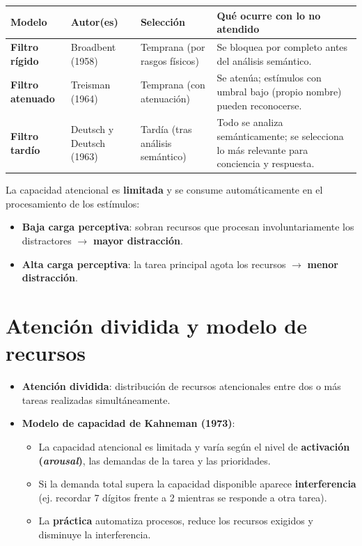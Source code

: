 \documentclass[11pt,a4paper]{article}
\begin{document}
\begin{center}
\begin{tabular}{@{}p{3.1cm}p{2.9cm}p{3.4cm}p{5.0cm}@{}}
\toprule
\textbf{Modelo} & \textbf{Autor(es)} & \textbf{Selección} & \textbf{Qué ocurre con lo no atendido} \\
\midrule
\textbf{Filtro rígido} & Broadbent (1958) & Temprana (por rasgos físicos) & Se bloquea por completo antes del análisis semántico. \\
\textbf{Filtro atenuado} & Treisman (1964) & Temprana (con atenuación) & Se atenúa; estímulos con umbral bajo (propio nombre) pueden reconocerse. \\
\textbf{Filtro tardío} & Deutsch y Deutsch (1963) & Tardía (tras análisis semántico) & Todo se analiza semánticamente; se selecciona lo más relevante para conciencia y respuesta. \\
\bottomrule
\end{tabular}
\end{center}

\begin{cajaClave}[title={Teoría de la carga perceptiva (Lavie, 1995; Forster y Lavie, 2008)}]
La capacidad atencional es \textbf{limitada} y se consume automáticamente en el procesamiento de los estímulos:
\begin{itemize}
  \item \textbf{Baja carga perceptiva}: sobran recursos que procesan involuntariamente los distractores $\rightarrow$ \textbf{mayor distracción}.
  \item \textbf{Alta carga perceptiva}: la tarea principal agota los recursos $\rightarrow$ \textbf{menor distracción}.
\end{itemize}
\end{cajaClave}

\section{Atención dividida y modelo de recursos}

\begin{itemize}
  \item \textbf{Atención dividida}: distribución de recursos atencionales entre dos o más tareas realizadas simultáneamente.
  \item \textbf{Modelo de capacidad de Kahneman (1973)}:
  \begin{itemize}
    \item La capacidad atencional es limitada y varía según el nivel de \textbf{activación (\textit{arousal})}, las demandas de la tarea y las prioridades.
    \item Si la demanda total supera la capacidad disponible aparece \textbf{interferencia} (ej. recordar 7 dígitos frente a 2 mientras se responde a otra tarea).
    \item La \textbf{práctica} automatiza procesos, reduce los recursos exigidos y disminuye la interferencia.
  \end{itemize}
\end{itemize}
\end{document}
